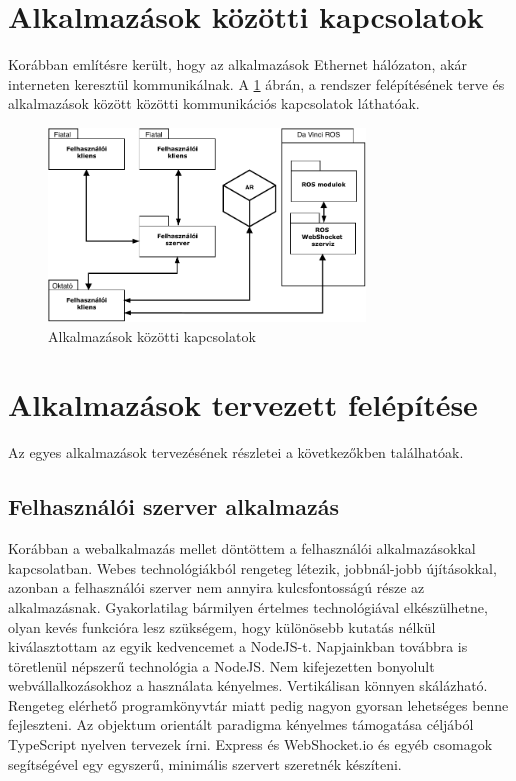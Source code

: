 \documentclass[12pt,a4paper,oneside]{report} %
\begin{document}
\section{Alkalmazások közötti kapcsolatok}
Korábban említésre került, hogy az alkalmazások Ethernet hálózaton, akár interneten keresztül kommunikálnak. A \ref{fig:kapcs} ábrán, a rendszer felépítésének terve és alkalmazások között közötti kommunikációs kapcsolatok láthatóak.
\begin{figure}[h]
	\label{fig:kapcs}
	\centering
	\includegraphics[width=0.75\textwidth]{dias/alkalmazas_kapcsolatok}
	\caption{Alkalmazások közötti kapcsolatok}
\end{figure}

\section{Alkalmazások tervezett felépítése}
Az egyes alkalmazások tervezésének részletei a következőkben találhatóak.
\subsection{Felhasználói szerver alkalmazás}
Korábban a webalkalmazás mellet döntöttem a felhasználói alkalmazásokkal kapcsolatban. Webes technológiákból rengeteg létezik, jobbnál-jobb újításokkal, azonban a felhasználói szerver nem annyira kulcsfontosságú része az alkalmazásnak. Gyakorlatilag bármilyen értelmes technológiával elkészülhetne, olyan kevés funkcióra lesz szükségem, hogy különösebb kutatás nélkül kiválasztottam az egyik kedvencemet a NodeJS-t.
Napjainkban továbbra is töretlenül népszerű technológia a NodeJS. Nem kifejezetten bonyolult webvállalkozásokhoz a használata kényelmes. Vertikálisan könnyen skálázható. Rengeteg elérhető programkönyvtár miatt pedig nagyon gyorsan lehetséges benne fejleszteni.
Az objektum orientált paradigma kényelmes támogatása céljából TypeScript nyelven tervezek írni. Express és WebShocket.io és egyéb csomagok segítségével egy egyszerű, minimális szervert szeretnék készíteni.
\end{document}
